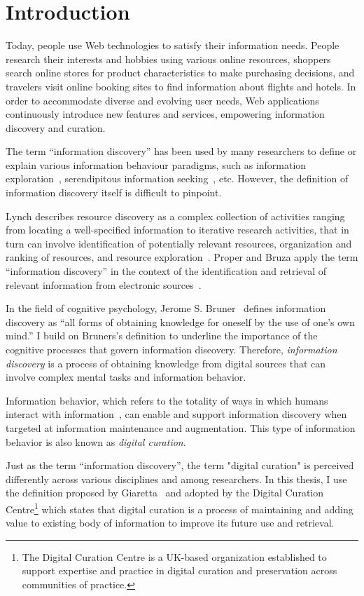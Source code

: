 \chapter{Introduction}
\label{chapter:chapter_intro}

Today, people use Web technologies to satisfy their information needs. People research their interests and hobbies using various online resources, shoppers search online stores for product characteristics to make purchasing decisions, and travelers visit online booking sites to find information about flights and hotels. In order to accommodate diverse and evolving user needs, Web applications continuously introduce new features and services, empowering information discovery and curation. 


The term ``information discovery'' has been used by many researchers to define or explain various information behaviour paradigms, such as information exploration~\cite{waterworth1991model}, serendipitous information seeking~\cite{foster2003serendipity}, etc. However, the definition of information discovery itself is difficult to pinpoint. 

Lynch describes resource discovery as a complex collection of activities ranging from locating a well-specified information to iterative research activities, that in turn can involve identification
of potentially relevant resources, organization and ranking of resources, and resource exploration~\cite{lynch1995networked}. Proper and Bruza apply the term ``information discovery'' in the context of  the identification and retrieval of relevant information from electronic sources~\cite{proper1999information}. 

In the field of cognitive psychology, Jerome S. Bruner~\cite{bruner1961act} defines information discovery as ``all forms of obtaining knowledge for oneself by the use of one's own mind.'' I build on Bruners's definition to underline the importance of the cognitive processes that govern information discovery. Therefore, \textit{information discovery} is a process of obtaining knowledge from digital sources that can involve complex mental tasks and information behavior.  

Information behavior, which refers to the totality of ways in which humans interact with information~\cite{wilson2000human}, can enable and support information discovery when targeted at information maintenance and augmentation. This type of information behavior is also known as \textit{digital curation}.

Just as the term ``information discovery'', the term "digital curation" is perceived differently across various disciplines and among researchers. In this thesis, I use the definition proposed by Giaretta~\cite{giaretta2006dcc} and adopted by the Digital Curation Centre\footnote{The Digital Curation Centre is a UK-based organization established to support expertise and practice in digital curation and preservation across communities of practice.} which states that digital curation is a process of maintaining and adding value to existing body of information to improve its future use and retrieval.   

